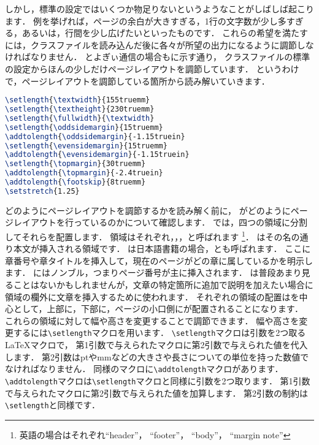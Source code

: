 しかし，標準の設定ではいくつか物足りないというようなことがしばしば起こります．
例を挙げれば，ページの余白が大きすぎる，1行の文字数が少し多すぎる，あるいは，行間を少し広げたいといったものです．
これらの希望を満たすには，クラスファイルを読み込んだ後に各々が所望の出力になるように調節しなければなりません．
とよぎぃ通信の場合もに示す通り，
クラスファイルの標準の設定からほんの少しだけページレイアウトを調節しています．
というわけで，ページレイアウトを調節している箇所から読み解いていきます．
\begin{lstlisting}[caption = ページレイアウトの調節,label = list:layout,language = tex]
\setlength{\textwidth}{155truemm}
\setlength{\textheight}{230truemm}
\setlength{\fullwidth}{\textwidth}
\setlength{\oddsidemargin}{15truemm}
\addtolength{\oddsidemargin}{-1.15truein}
\setlength{\evensidemargin}{15truemm}
\addtolength{\evensidemargin}{-1.15truein}
\setlength{\topmargin}{30truemm}
\addtolength{\topmargin}{-2.4truein}
\addtolength{\footskip}{8truemm}
\setstretch{1.25}
\end{lstlisting}

どのようにページレイアウトを調節するかを読み解く前に，
{\pLaTeX}がどのようにページレイアウトを行っているのかについて確認します．
{\pLaTeX}では，四つの領域に分割してそれらを配置します．
領域はそれぞれ，，，と呼ばれます
\footnote{英語の場合はそれぞれ``header''， ``footer''， ``body''， ``margin note''}．
はその名の通り本文が挿入される領域です．
は日本語書籍の場合，とも呼ばれます．
ここに章番号や章タイトルを挿入して，現在のページがどの章に属しているかを明示します．
にはノンブル，つまりページ番号が主に挿入されます．
は普段あまり見ることはないかもしれませんが，文章の特定箇所に追加で説明を加えたい場合に領域の欄外に文章を挿入するために使われます．
それぞれの領域の配置はを中心として，上部に，下部に，ページの小口側にが配置されることになります．
これらの領域に対して幅や高さを変更することで調節できます．
幅や高さを変更するには\verb|\setlength|マクロを用います．
\verb|\setlength|マクロは引数を2つ取る{\LaTeX}マクロで，
第1引数で与えられたマクロに第2引数で与えられた値を代入します．
第2引数はptやmmなどの大きさや長さについての単位を持った数値でなければなりません．
同様のマクロに\verb|\addtolength|マクロがあります．
\verb|\addtolength|マクロは\verb|\setlength|マクロと同様に引数を2つ取ります．
第1引数で与えられたマクロに第2引数で与えられた値を加算します．
第2引数の制約は\verb|\setlength|と同様です．

